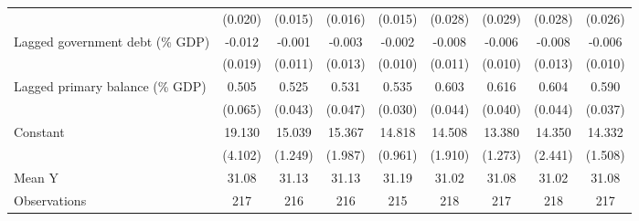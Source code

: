 {\begin{tabular}{l*{8}{c}}
                    &     (0.020)         &     (0.015)         &     (0.016)         &     (0.015)         &     (0.028)         &     (0.029)         &     (0.028)         &     (0.026)         \\
\addlinespace
Lagged government debt (\% GDP)&      -0.012         &      -0.001         &      -0.003         &      -0.002         &      -0.008         &      -0.006         &      -0.008         &      -0.006         \\
                    &     (0.019)         &     (0.011)         &     (0.013)         &     (0.010)         &     (0.011)         &     (0.010)         &     (0.013)         &     (0.010)         \\
\addlinespace
Lagged primary balance (\% GDP)&       0.505\sym{***}&       0.525\sym{***}&       0.531\sym{***}&       0.535\sym{***}&       0.603\sym{***}&       0.616\sym{***}&       0.604\sym{***}&       0.590\sym{***}\\
                    &     (0.065)         &     (0.043)         &     (0.047)         &     (0.030)         &     (0.044)         &     (0.040)         &     (0.044)         &     (0.037)         \\
\addlinespace
Constant            &      19.130\sym{***}&      15.039\sym{***}&      15.367\sym{***}&      14.818\sym{***}&      14.508\sym{***}&      13.380\sym{***}&      14.350\sym{***}&      14.332\sym{***}\\
                    &     (4.102)         &     (1.249)         &     (1.987)         &     (0.961)         &     (1.910)         &     (1.273)         &     (2.441)         &     (1.508)         \\
\midrule
Mean Y              &       31.08         &       31.13         &       31.13         &       31.19         &       31.02         &       31.08         &       31.02         &       31.08         \\
Observations        &         217         &         216         &         216         &         215         &         218         &         217         &         218         &         217         \\
\bottomrule
\end{tabular}
}
